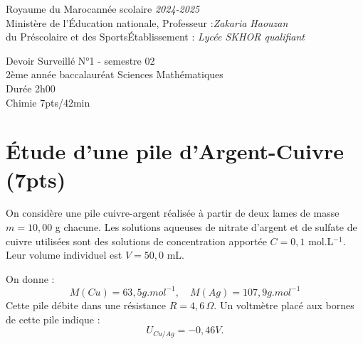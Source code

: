 \documentclass[12pt]{article}
\newcommand\headerMe[2]{\noindent{}#1\hfill#2}
\begin{document}
\headerMe{Royaume du Maroc}{année scolaire \emph{2024-2025}}\\
\headerMe{Ministère de l'Éducation nationale, }{  Professeur :\emph{Zakaria Haouzan}}\\
\headerMe{du Préscolaire et des Sports}{Établissement : \emph{Lycée SKHOR qualifiant}}\\

\begin{center}
  \vspace{-1cm}
Devoir Surveillé  N°1 - semestre 02 \\
    2ème année baccalauréat Sciences Mathématiques\\
Durée 2h00
\\
    \vspace{-0.2cm}
\hrulefill
\Large{Chimie 7pts/42min}
\hrulefill\\


\end{center}

\vspace{-1cm}
 \section*{ Étude d’une pile d’Argent-Cuivre \dotfill(7pts) }
On considère une pile cuivre-argent réalisée à partir de deux lames de masse $m = 10,00$ g chacune. Les solutions aqueuses de nitrate d'argent et de sulfate de cuivre utilisées sont des solutions de concentration apportée $C = 0,1$ mol.L$^{-1}$. Leur volume individuel est $V = 50,0$ mL. 

On donne :
\[
M({Cu}) = 63,5  g.mol^{-1}, \quad M(Ag) = 107,9  g.mol^{-1}
\]
Cette pile débite dans une résistance $R = 4,6 \, \Omega$. Un voltmètre placé aux bornes de cette pile indique :
\[
U_{{Cu/Ag}} = -0,46 { V}.
\]
\end{document}
